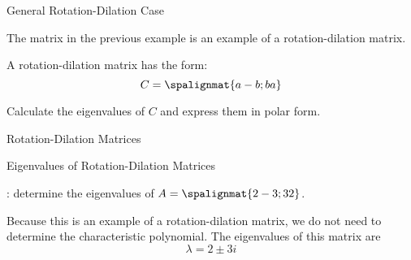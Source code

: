 \begin{frame}
\end{frame}


\begin{frame}{General Rotation-Dilation Case}

    The matrix in the previous example is an example of a rotation-dilation matrix. 
    
    \pause 
    
    \vspace{12pt}
    
    A rotation-dilation matrix has the form: 
    \[  C =  \spalignmat{ a  -b ; b  a } \]
    
    \pause 
    
    Calculate the eigenvalues of $C$ and express them in polar form.


\end{frame}


\begin{frame}
\end{frame}


\begin{frame}{Rotation-Dilation Matrices}

    \begin{center}\end{center}
    
\end{frame}


\begin{frame}{Eigenvalues of Rotation-Dilation Matrices}

    : determine the eigenvalues of $A=\spalignmat{2 -3;3 2}$. 
    
    \pause 
    
    Because this is an example of a rotation-dilation matrix, we do not need to determine the characteristic polynomial. \pause The eigenvalues of this matrix are $$\lambda = 2 \pm 3i$$
\end{frame}


